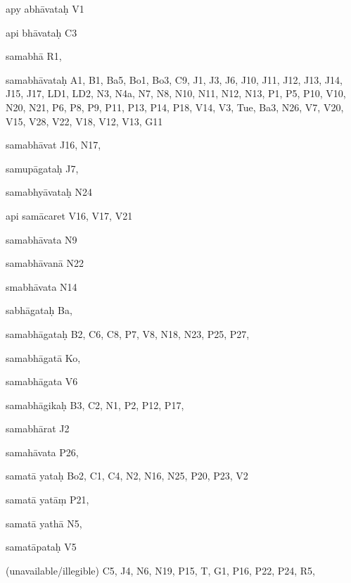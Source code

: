 \begin{marma}[hp02_009]
\begin{marma}[hp02_011]
\begin{marma}[hp02_021]
\begin{description}
    \end{description}
 \end{marma}


 \begin{marma}[hp02_021d]
\item[apy abhāvataḥ] V1
\item[api bhāvataḥ] C3
\item[samabhā] R1,
\item[samabhāvataḥ] A1, B1, Ba5, Bo1, Bo3, C9, J1, J3, J6, J10, J11, J12, J13, J14, J15, J17, LD1, LD2, N3, N4a, N7, N8, N10, N11, N12, N13, P1, P5, P10, V10, N20, N21, P6, P8, P9, P11, P13, P14, P18, V14, V3, Tue, Ba3, N26, V7, V20, V15, V28, V22, V18, V12, V13, G11
\item[samabhāvat] J16, N17, 
\item[samupāgataḥ] J7,
\item[samabhyāvataḥ] N24
\item[api samācaret] V16, V17, V21
\item[samabhāvata]  N9	
\item[samabhāvanā] N22
\item[smabhāvata]  N14
\item[sabhāgataḥ] Ba,
\item[samabhāgataḥ] B2, C6, C8, P7, V8, N18, N23, P25, P27, 
\item[samabhāgatā] Ko,
\item[samabhāgata] V6
\item[samabhāgikaḥ] B3, C2, N1, P2, P12, P17, 
\item[samabhārat] J2
\item[samahāvata]  P26, 
\item[samatā yataḥ]  Bo2, C1, C4, N2, N16, N25, P20, P23, V2
\item[samatā yatāṃ]  P21, 
\item[samatā yathā]   N5,
\item[samatāpataḥ] V5
\item[(unavailable/illegible)] C5, J4, N6, N19, P15, T, G1, P16, P22, P24, R5,
  \begin{description}

    \end{description}
 \end{marma}


 \begin{marma}[hp02_022a-c]
\sthana{}
  \begin{description}
    \end{description}
 \end{marma}



\end{marma}
\end{marma}
